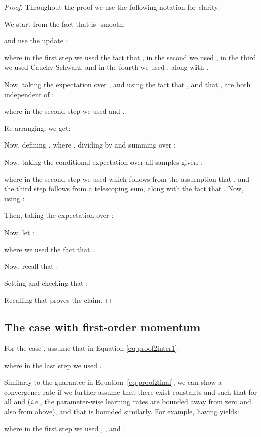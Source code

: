 \documentclass{article}
\newcommand{\ie}{\textit{i.e.,} }
\begin{document}
\begin{proof}

Throughout the proof we use the following notation for clarity: 

We start from the fact that  is -smooth:

and use the update :

where in the first step we used the fact that
,
in the second we used
,
in the third we used Cauchy-Schwarz,
and in the fourth we used , along with
.

Now, taking the expectation over , and using the fact that , and that ,  are both independent of :

where in the second step we used
 and
.

Re-arranging, we get:


Now, defining
   , where , dividing by  and summing over :


Now, taking the conditional expectation over all samples  given :

where in the second step we used  which follows from the assumption that , and the third step follows from a telescoping sum, along with the fact that .  Now, using
:


Then, taking the expectation over :


Now, let :


where we used the fact that .

Now, recall that :


Setting  and checking that :


Recalling that  proves the claim.

\end{proof}

\subsection{The case with first-order momentum}
\label{sec:proof2-momentum}
For the case , assume that  in Equation \ref{eq-proof2inter1}:


where in the last step we used .

Similarly to the guarantee in Equation~\ref{eq-proof2final}, we can show a  convergence rate if we further assume that there exist constants  and  such that
 for all  and  (\ie the parameter-wise learning rates are bounded away from zero and also from above), and that  is bounded similarly. For example, having  yields:


where in the first step we used , , and .
\end{document}

